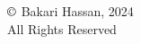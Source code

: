 \restoregeometry

\cleardoublepage

\frontmatter

\thispagestyle{empty}

{%
\begin{vplace}[1]
	\centering
	$\copyright$ Bakari Hassan, 2024\\
	All Rights Reserved
\end{vplace}
}%

\cleardoublepage





% 

\cleardoublepage

%


\clearpage

\cleardoublepage

\tableofcontents*

\clearpage

\listoffigures

\clearpage

\listoftables

\cleardoublepage

\mainmatter

